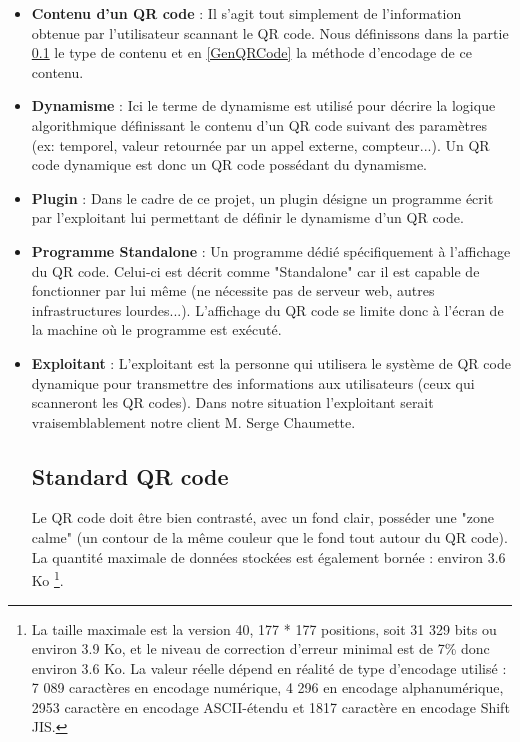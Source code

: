 \documentclass[a4paper,12pt]{article}
\begin{document}
\begin{itemize}
    \item \textbf{Contenu d'un QR code} : Il s'agit tout simplement de l'information obtenue par l'utilisateur scannant le QR code. Nous définissons dans la partie \ref{stadardQR} le type de contenu et en \ref{GenQRCode} la méthode d'encodage de ce contenu.\\
    
    \item \textbf{Dynamisme} : Ici le terme de dynamisme est utilisé pour décrire la logique algorithmique définissant le contenu d'un QR code suivant des paramètres (ex: temporel, valeur retournée par un appel externe, compteur...). Un QR code dynamique est donc un QR code possédant du dynamisme.\\
    
    \item \textbf{Plugin} : Dans le cadre de ce projet, un plugin désigne un programme écrit par l'exploitant lui permettant de définir le dynamisme d'un QR code.\\
    
    \item \textbf{Programme Standalone} : Un programme dédié spécifiquement à l'affichage du QR code. Celui-ci est décrit comme "Standalone" car il est capable de fonctionner par lui même (ne nécessite pas de serveur web, autres infrastructures lourdes...). L'affichage du QR code se limite donc à l'écran de la machine où le programme est exécuté.\\
    
    \item \textbf{Exploitant} : L'exploitant est la personne qui utilisera le système de QR code dynamique pour transmettre des informations aux utilisateurs (ceux qui scanneront les QR codes). Dans notre situation l'exploitant serait vraisemblablement notre client M. Serge Chaumette.\\

\newpage
\subsection{Standard QR code}

\label{stadardQR}

Le QR code doit être bien contrasté, avec un fond clair, posséder une "zone calme" (un contour de la même couleur que le fond tout autour du QR code). La quantité maximale de données stockées est également bornée : environ 3.6 Ko \footnote{La taille maximale est la version 40, 177 * 177 positions, soit 31 329 bits ou environ 3.9 Ko, et le niveau de correction d'erreur minimal est de 7\% donc environ 3.6 Ko. La valeur réelle dépend en réalité de type d'encodage utilisé : 7 089 caractères en encodage numérique, 4 296 en encodage alphanumérique, 2953 caractère en encodage ASCII-étendu et 1817 caractère en encodage Shift JIS.}.\\


\end{itemize}
\end{document}
